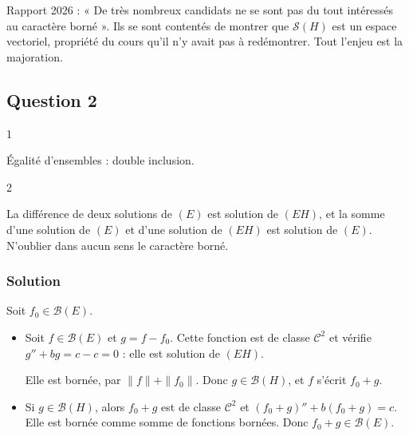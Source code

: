 \documentclass[11pt,a4paper]{article}
\newcommand{\equationajustee}[1]{%
  \sbox{\boiteequation}{$\displaystyle #1$}%
  \ifdim\wd\boiteequation>\linewidth
    \[\resizebox{\linewidth}{!}{\usebox{\boiteequation}}\]%
  \else
    \[#1\]%
  \fi}
\begin{document}
\begin{jury}

Rapport 2026 : « De très nombreux candidats ne se sont pas du tout intéressés au caractère borné ». Ils se sont contentés de montrer que \(\mathcal S(H)\) est un espace vectoriel, propriété du cours qu'il n'y avait pas à redémontrer. Tout l'enjeu est la majoration.

\end{jury}

\hypertarget{question-2}{%
\subsection{Question 2}\label{question-2}}

\begin{indication}{1}

Égalité d'ensembles : double inclusion.

\end{indication}

\begin{indication}{2}

La différence de deux solutions de \((E)\) est solution de \((EH)\), et la somme d'une solution de \((E)\) et d'une solution de \((EH)\) est solution de \((E)\). N'oublier dans aucun sens le caractère borné.

\end{indication}

\hypertarget{solution-1}{%
\subsubsection{Solution}\label{solution-1}}

Soit \(f_0\in\mathcal B(E)\).

\begin{itemize}
\item
  Soit \(f\in\mathcal B(E)\) et \(g=f-f_0\). Cette fonction est de classe \(\mathcal C^2\) et vérifie \(g''+bg=c-c=0\) : elle est solution de \((EH)\).

  Elle est bornée, par \(\|f\|+\|f_0\|\). Donc \(g\in\mathcal B(H)\), et \(f\) s'écrit \(f_0+g\).
\item
  Si \(g\in\mathcal B(H)\), alors \(f_0+g\) est de classe \(\mathcal C^2\) et \((f_0+g)''+b(f_0+g)=c\). Elle est bornée comme somme de fonctions bornées. Donc \(f_0+g\in\mathcal B(E)\).
\end{itemize}

\equationajustee{\boxed{\mathcal B(E)=\{f_0+g,\ g\in\mathcal B(H)\}.}}
\end{document}
